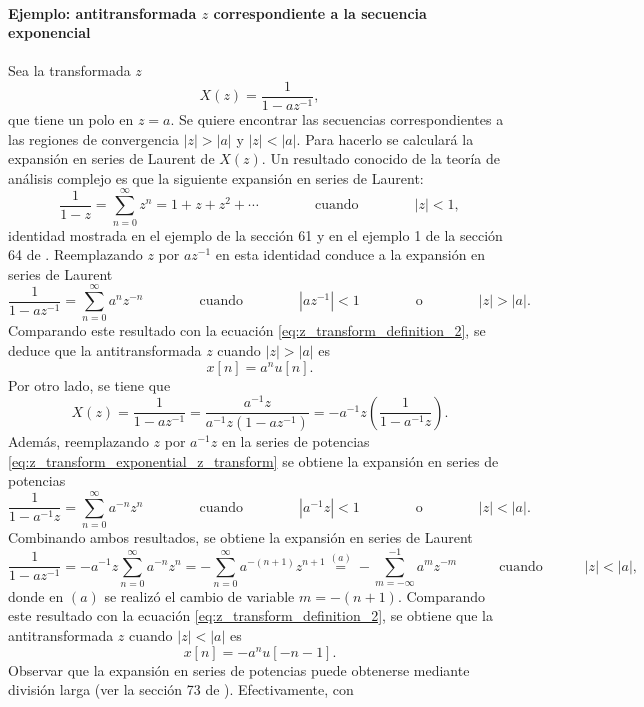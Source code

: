 \documentclass[a4paper]{report}
\begin{document}
\paragraph{Ejemplo: antitransformada \(z\) correspondiente a la secuencia exponencial}

Sea la transformada \(z\)
\[
 X(z)=\frac{1}{1-az^{-1}},
\]
que tiene un polo en \(z=a\). Se quiere encontrar las secuencias correspondientes a las regiones de convergencia
\(|z|>|a|\) y \(|z|<|a|\). Para hacerlo se calculará la expansión en series de Laurent de \(X(z)\). Un resultado conocido de la teoría de análisis complejo es que la siguiente expansión en series de Laurent:
\begin{equation}\label{eq:z_transform_exponential_z_transform}
 \frac{1}{1-z}=\sum_{n=0}^\infty z^n=1+z+z^2+\cdots
 \qquad\qquad\textrm{cuando}\qquad\qquad
 |z|<1, 
\end{equation}
identidad mostrada en el ejemplo de la sección 61 y en el ejemplo 1 de la sección 64 de \cite{brown2013complex}. Reemplazando \(z\) por \(az^{-1}\) en esta identidad conduce a la expansión en series de Laurent
\[
 \frac{1}{1-az^{-1}}=\sum_{n=0}^\infty a^nz^{-n}
 \qquad\qquad\textrm{cuando}\qquad\qquad
 |az^{-1}|<1
 \qquad\qquad\textrm{o}\qquad\qquad
 |z|>|a|.
\]
Comparando este resultado con la ecuación \ref{eq:z_transform_definition_2}, se deduce que la antitransformada \(z\) cuando \(|z|>|a|\) es
\[
 x[n]=a^nu[n].
\]
Por otro lado, se tiene que
\begin{equation}\label{eq:z_transform_exponential_anticausal}
 X(z)=\frac{1}{1-az^{-1}}=\frac{a^{-1}z}{a^{-1}z(1-az^{-1})}=-a^{-1}z\left(\frac{1}{1-a^{-1}z}\right). 
\end{equation}
Además, reemplazando \(z\) por \(a^{-1}z\) en la series de potencias \ref{eq:z_transform_exponential_z_transform} se obtiene la expansión en series de potencias
\[
 \frac{1}{1-a^{-1}z}=\sum_{n=0}^\infty a^{-n}z^n
 \qquad\qquad\textrm{cuando}\qquad\qquad
 |a^{-1}z|<1
 \qquad\qquad\textrm{o}\qquad\qquad
 |z|<|a|.
\]
Combinando ambos resultados, se obtiene la expansión en series de Laurent
\[
 \frac{1}{1-az^{-1}}=-a^{-1}z\sum_{n=0}^\infty a^{-n}z^n=-\sum_{n=0}^\infty a^{-(n+1)}z^{n+1}
  \overset{(a)}{=}-\sum_{m=-\infty}^{-1} a^mz^{-m}
  \quad\qquad\textrm{cuando}\quad\qquad
  |z|<|a|,
\]
donde en \((a)\) se realizó el cambio de variable \(m=-(n+1)\). Comparando este resultado con la ecuación \ref{eq:z_transform_definition_2}, se obtiene que la antitransformada \(z\) cuando \(|z|<|a|\) es
\[
 x[n]=-a^nu[-n-1].
\]
Observar que la expansión en series de potencias puede obtenerse mediante división larga (ver la sección 73 de \cite{brown2013complex}). Efectivamente, con 
\end{document}
